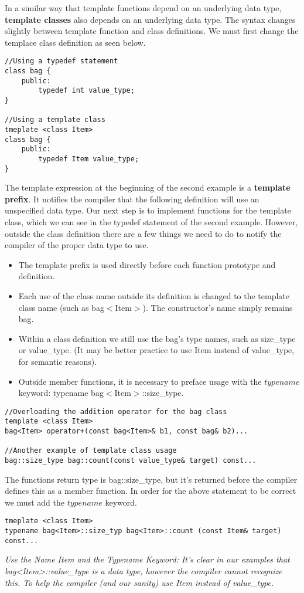 In a similar way that template functions depend on an underlying data type, \textbf{template classes} also depends on an underlying data type.
The syntax changes slightly between template function and class definitions. We must first change the templace class definition as seen below.
\begin{lstlisting}
//Using a typedef statement
class bag {
    public:
        typedef int value_type;
}

//Using a template class
tmeplate <class Item>
class bag {
    public:
        typedef Item value_type;
}
\end{lstlisting}
The template expression at the beginning of the second example is a \textbf{template prefix}. It notifies the compiler that the following definition will use an unspecified data type. Our next step is to implement functions for the template class, which we can see in the typedef statement of the second example. However, outside the class definition there are a few things we need to do to notify the compiler of the proper data type to use.
\begin{itemize}
\item The template prefix is used directly before each function prototype and definition.
\item Each use of the class name outside its definition is changed to the template class name (such as bag$<$Item$>$). The constructor's name simply remains bag.
\item Within a class definition we still use the bag's type names, such as size\_type or value\_type. (It may be better practice to use Item instead of value\_type, for semantic reasons).
\item Outside member functions, it is necessary to preface usage with the $typename$ keyword: typename bag$<$Item$>$::size\_type.
\end{itemize}
\begin{lstlisting}
//Overloading the addition operator for the bag class
template <class Item>
bag<Item> operator+(const bag<Item>& b1, const bag& b2)...

//Another example of template class usage
bag::size_type bag::count(const value_type& target) const...
\end{lstlisting}
The functions return type is bag::size\_type, but it's returned before the compiler defines this as a member function. In order for the above statement to be correct we must add the $typename$ keyword.
\begin{lstlisting}
tmeplate <class Item>
typename bag<Item>::size_typ bag<Item>::count (const Item& target) const...
\end{lstlisting}
\emph{Use the Name Item and the Typename Keyword:  It's clear in our examples that bag<Item>::value_type is a data type, however the compiler cannot recognize this. To help the compiler (and our sanity) use Item instead of value_type.}



